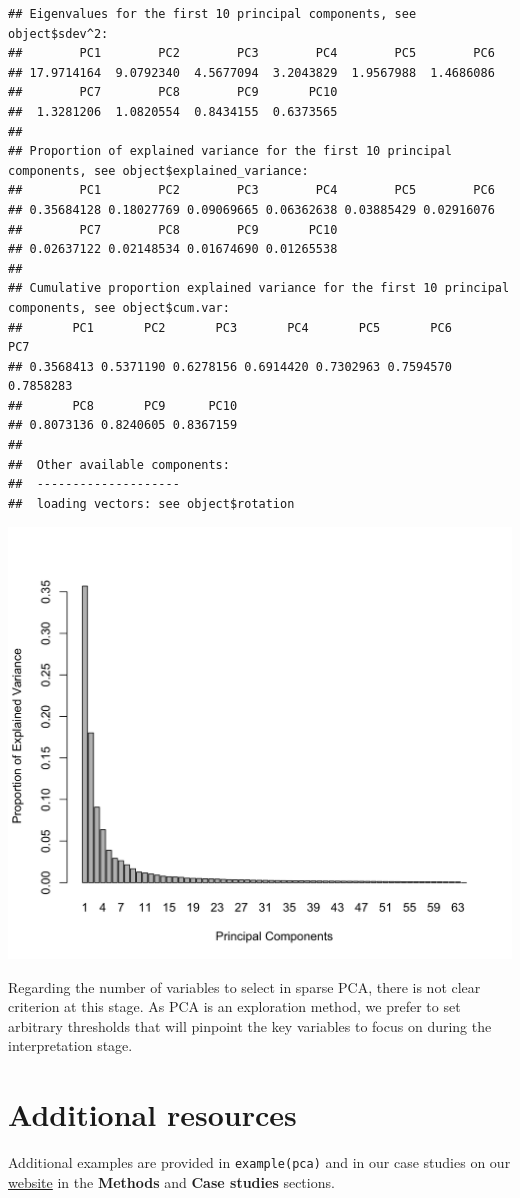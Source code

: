 \documentclass[]{book}
\theoremstyle{definition}
\theoremstyle{definition}
\theoremstyle{definition}
\theoremstyle{remark}
\begin{document}
\begin{verbatim}
## Eigenvalues for the first 10 principal components, see object$sdev^2: 
##        PC1        PC2        PC3        PC4        PC5        PC6 
## 17.9714164  9.0792340  4.5677094  3.2043829  1.9567988  1.4686086 
##        PC7        PC8        PC9       PC10 
##  1.3281206  1.0820554  0.8434155  0.6373565 
## 
## Proportion of explained variance for the first 10 principal components, see object$explained_variance: 
##        PC1        PC2        PC3        PC4        PC5        PC6 
## 0.35684128 0.18027769 0.09069665 0.06362638 0.03885429 0.02916076 
##        PC7        PC8        PC9       PC10 
## 0.02637122 0.02148534 0.01674690 0.01265538 
## 
## Cumulative proportion explained variance for the first 10 principal components, see object$cum.var: 
##       PC1       PC2       PC3       PC4       PC5       PC6       PC7 
## 0.3568413 0.5371190 0.6278156 0.6914420 0.7302963 0.7594570 0.7858283 
##       PC8       PC9      PC10 
## 0.8073136 0.8240605 0.8367159 
## 
##  Other available components: 
##  -------------------- 
##  loading vectors: see object$rotation
\end{verbatim}

\begin{center}\includegraphics[width=0.5\linewidth]{Figures/unnamed-chunk-14-1} \end{center}

Regarding the number of variables to select in sparse PCA, there is not
clear criterion at this stage. As PCA is an exploration method, we
prefer to set arbitrary thresholds that will pinpoint the key variables
to focus on during the interpretation stage.

\section{Additional resources}\label{additional-resources}

Additional examples are provided in \texttt{example(pca)} and in our
case studies on our \href{http://www.mixomics.org}{website} in the
\textbf{Methods} and \textbf{Case studies} sections.
\end{document}
